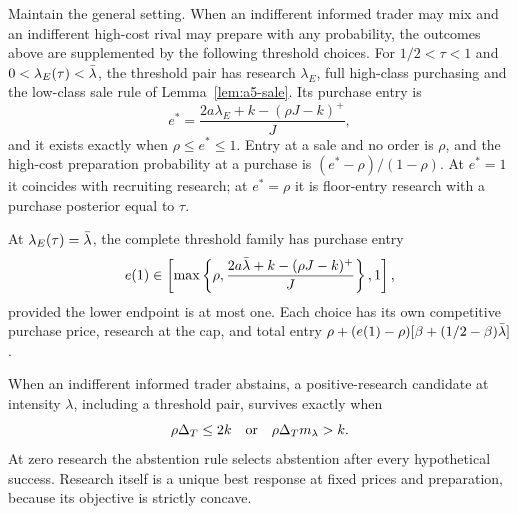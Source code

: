 \begin{remark}\label{rem:researchties}
Maintain the general setting. When an indifferent informed trader may mix and an indifferent high-cost rival may
prepare with any probability, the outcomes above are supplemented by the following threshold choices.
For \(1/2<\tau<1\) and \(0<\lambda_E(\tau)<\bar\lambda\), the threshold pair has research \(\lambda_E\), full high-class
purchasing and the low-class sale rule of Lemma~\ref{lem:a5-sale}. Its purchase entry is
\[
 e^*=\frac{2a\lambda_E+k-(\rho J-k)^+}{J},
\]
and it exists exactly when \(\rho\le e^*\le1\). Entry at a sale and no order is \(\rho\), and the high-cost
preparation probability at a purchase is \((e^*-\rho)/(1-\rho)\). At \(e^*=1\) it coincides with recruiting
research; at \(e^*=\rho\) it is floor-entry research with a purchase posterior equal to \(\tau\).

At \(\lambda_E(\tau)=\bar\lambda\), the complete threshold family has purchase entry
\[
 e(1)\in\left[\max\left\{\rho,\frac{2a\bar\lambda+k-(\rho J-k)^+}{J}\right\},1\right],
\]
provided the lower endpoint is at most one. Each choice has its own competitive purchase price, research at the
cap, and total entry \(\rho+(e(1)-\rho)[\beta+(1/2-\beta)\bar\lambda]\).

When an indifferent informed trader abstains, a positive-research candidate at intensity \(\lambda\), including a
threshold pair, survives exactly when
\[
 \rho\Delta_T\le2k\quad\hbox{or}\quad\rho\Delta_T m_\lambda>k.
\]
At zero research the abstention rule selects abstention after every hypothetical success. Research itself is a
unique best response at fixed prices and preparation, because its objective is strictly concave.
\end{remark}

